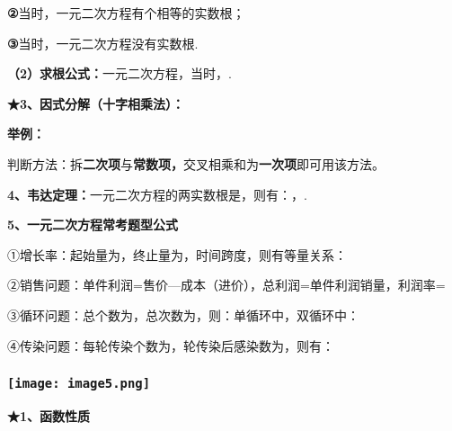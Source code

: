 \textbf{②}当时，一元二次方程有个相等的实数根；

\textbf{③}当时，一元二次方程没有实数根.

\textbf{（2）求根公式：}一元二次方程，当时，.

\textbf{★3、因式分解（十字相乘法）：}

\textbf{举例：}

判断方法：拆\textbf{二次项}与\textbf{常数项，}交叉相乘和为\textbf{一次项}即可用该方法。

\textbf{4、韦达定理：}一元二次方程的两实数根是，则有：，.

\textbf{5、一元二次方程常考题型公式}

①增长率：起始量为，终止量为，时间跨度，则有等量关系：

②销售问题：单件利润=售价---成本（进价），总利润=单件利润销量，利润率=

③循环问题：总个数为，总次数为，则：单循环中，双循环中：

④传染问题：每轮传染个数为，轮传染后感染数为，则有：

\hypertarget{ux5b66ux79d1ux7f51www.zxxk.com--ux6559ux80b2ux8d44ux6e90ux95e8ux6237ux63d0ux4f9bux8bd5ux9898ux8bd5ux5377ux6559ux6848ux8bfeux4ef6ux6559ux5b66ux8bbaux6587ux7d20ux6750ux7b49ux5404ux7c7bux6559ux5b66ux8d44ux6e90ux5e93ux4e0bux8f7dux8fd8ux6709ux5927ux91cfux4e30ux5bccux7684ux6559ux5b66ux8d44ux8baf-39}{%
\subsubsection{\texorpdfstring{\protect\texttt{[image: image5.png]}}{学科网(www.zxxk.com)-\/-教育资源门户，提供试题试卷、教案、课件、教学论文、素材等各类教学资源库下载，还有大量丰富的教学资讯！}}\label{ux5b66ux79d1ux7f51www.zxxk.com--ux6559ux80b2ux8d44ux6e90ux95e8ux6237ux63d0ux4f9bux8bd5ux9898ux8bd5ux5377ux6559ux6848ux8bfeux4ef6ux6559ux5b66ux8bbaux6587ux7d20ux6750ux7b49ux5404ux7c7bux6559ux5b66ux8d44ux6e90ux5e93ux4e0bux8f7dux8fd8ux6709ux5927ux91cfux4e30ux5bccux7684ux6559ux5b66ux8d44ux8baf-39}}

\textbf{★1、函数性质}

